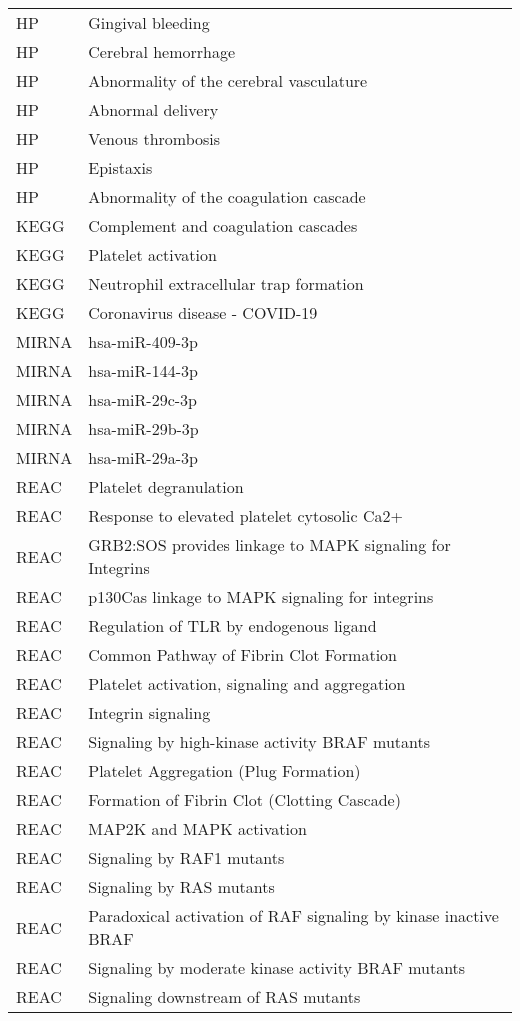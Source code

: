 \begin{longtable}{ll}
HP & Gingival bleeding\\
HP & Cerebral hemorrhage\\
HP & Abnormality of the cerebral vasculature\\
HP & Abnormal delivery\\
HP & Venous thrombosis\\
HP & Epistaxis\\
HP & Abnormality of the coagulation cascade\\
KEGG & Complement and coagulation cascades\\
KEGG & Platelet activation\\
KEGG & Neutrophil extracellular trap formation\\
KEGG & Coronavirus disease - COVID-19\\
MIRNA & hsa-miR-409-3p\\
MIRNA & hsa-miR-144-3p\\
MIRNA & hsa-miR-29c-3p\\
MIRNA & hsa-miR-29b-3p\\
MIRNA & hsa-miR-29a-3p\\
REAC & Platelet degranulation\\
REAC & Response to elevated platelet cytosolic Ca2+\\
REAC & GRB2:SOS provides linkage to MAPK signaling for Integrins\\
REAC & p130Cas linkage to MAPK signaling for integrins\\
REAC & Regulation of TLR by endogenous ligand\\
REAC & Common Pathway of Fibrin Clot Formation\\
REAC & Platelet activation, signaling and aggregation\\
REAC & Integrin signaling\\
REAC & Signaling by high-kinase activity BRAF mutants\\
REAC & Platelet Aggregation (Plug Formation)\\
REAC & Formation of Fibrin Clot (Clotting Cascade)\\
REAC & MAP2K and MAPK activation\\
REAC & Signaling by RAF1 mutants\\
REAC & Signaling by RAS mutants\\
REAC & Paradoxical activation of RAF signaling by kinase inactive BRAF\\
REAC & Signaling by moderate kinase activity BRAF mutants\\
REAC & Signaling downstream of RAS mutants\\

\end{longtable}
